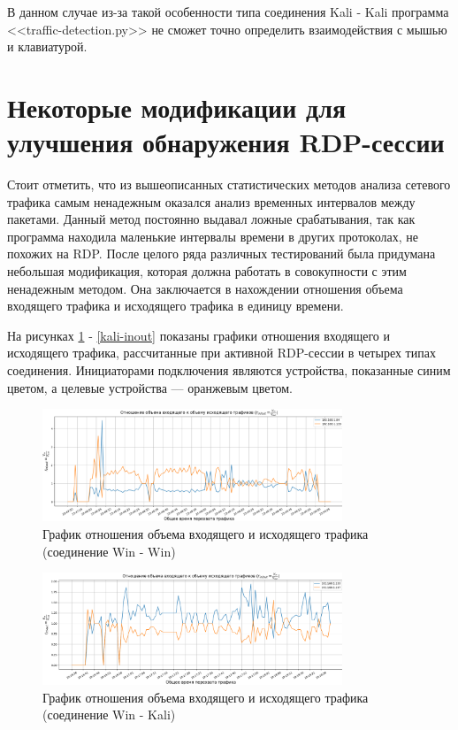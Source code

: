 \documentclass[bachelor, och, coursework]{SCWorks}
\begin{document}
В данном случае из-за такой особенности типа соединения Kali - Kali программа <<traffic-detection.py>> не сможет точно определить 
взаимодействия с мышью и клавиатурой.



\section{Некоторые модификации для улучшения обнаружения RDP-сессии}


Стоит отметить, что из вышеописанных статистических методов анализа сетевого трафика самым ненадежным оказался анализ временных интервалов между пакетами.
Данный метод постоянно выдавал ложные срабатывания, так как программа находила маленькие интервалы времени в других протоколах, не похожих на RDP. 
После целого ряда различных тестирований была придумана небольшая модификация, которая должна работать в совокупности с этим ненадежным методом.
Она заключается в нахождении отношения объема входящего трафика и исходящего трафика в единицу времени. 

На рисунках \ref{win-inout} - \ref{kali-inout} показаны графики отношения входящего и исходящего трафика, рассчитанные
при активной RDP-сессии в четырех типах соединения. Инициаторами подключения являются устройства, показанные синим цветом, 
а целевые устройства --- оранжевым цветом.


\begin{figure}[H]
  \centering
  \includegraphics[width=0.8\textwidth]{photo/inout-win.png}
  \caption{График отношения объема входящего и исходящего трафика (соединение Win - Win)}
  \label{win-inout}
\end{figure}


\begin{figure}[H]
  \centering
  \includegraphics[width=0.8\textwidth]{photo/inout-winkal.png}
  \caption{График отношения объема входящего и исходящего трафика (соединение Win - Kali)}
  \label{winkal-inout}
\end{figure}
\end{document}
